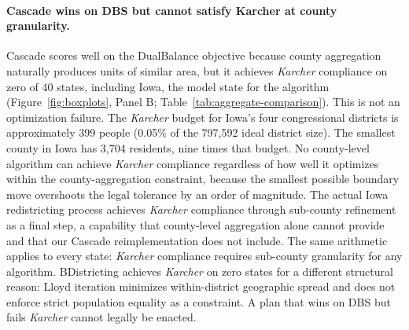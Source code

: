 \paragraph{Cascade wins on DBS but cannot satisfy Karcher at county granularity.}
Cascade scores well on the DualBalance objective because county
aggregation naturally produces units of similar area, but it achieves
\textit{Karcher} compliance on zero of 40 states, including Iowa, the
model state for the algorithm
(Figure~\ref{fig:boxplots}, Panel B; Table~\ref{tab:aggregate-comparison}).
This is not an optimization failure. The \textit{Karcher} budget for
Iowa's four congressional districts is approximately 399 people (0.05\%
of the 797,592 ideal district size). The smallest county in Iowa has
3,704 residents, nine times that budget. No county-level algorithm
can achieve \textit{Karcher} compliance regardless of how well it
optimizes within the county-aggregation constraint, because the
smallest possible boundary move overshoots the legal tolerance by
an order of magnitude. The actual Iowa redistricting process
achieves \textit{Karcher} compliance through sub-county refinement
as a final step, a capability that county-level aggregation alone
cannot provide and that our Cascade reimplementation does not include.
The same arithmetic applies to every state: \textit{Karcher} compliance
requires sub-county granularity for any algorithm. BDistricting
achieves \textit{Karcher} on zero states for a different structural
reason: Lloyd iteration minimizes within-district geographic spread
and does not enforce strict population equality as a constraint.
A plan that wins on DBS but fails \textit{Karcher} cannot legally be enacted.

